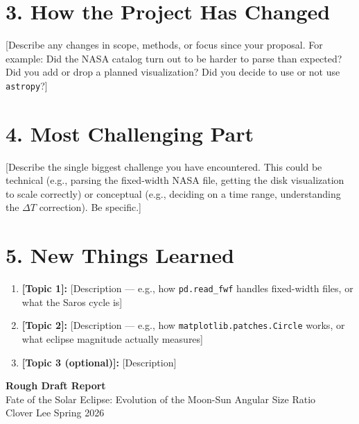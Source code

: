 \documentclass[11pt]{article}
\begin{document}
\section*{3. How the Project Has Changed}

[Describe any changes in scope, methods, or focus since your
proposal. For example: Did the NASA catalog turn out to be
harder to parse than expected? Did you add or drop a planned
visualization? Did you decide to use or not use \texttt{astropy}?]


\section*{4. Most Challenging Part}

[Describe the single biggest challenge you have encountered.
This could be technical (e.g., parsing the fixed-width NASA file,
getting the disk visualization to scale correctly) or conceptual
(e.g., deciding on a time range, understanding the $\Delta T$
correction). Be specific.]


\section*{5. New Things Learned}

\begin{enumerate}
    \item \textbf{[Topic 1]:} [Description — e.g., how \texttt{pd.read\_fwf}
          handles fixed-width files, or what the Saros cycle is]
    \item \textbf{[Topic 2]:} [Description — e.g., how \texttt{matplotlib.patches.Circle}
          works, or what eclipse magnitude actually measures]
    \item \textbf{[Topic 3 (optional)]:} [Description]
\end{enumerate}


\newpage
\begin{center}
    {\Large \textbf{Rough Draft Report}}\\[0.5em]
    {\large Fate of the Solar Eclipse: Evolution of the Moon-Sun Angular Size Ratio}\\[0.3em]
    Clover Lee \quad Spring 2026
\end{center}
\end{document}
